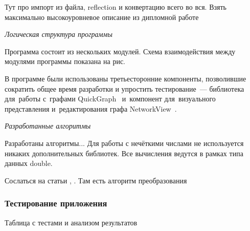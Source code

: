 Тут про импорт из файла, reflection и конвертацию всего во вся. Взять максимально высокоуровневое описание из дипломной работе

\textit{Логическая структура программы}

Программа состоит из нескольких модулей. Схема взаимодействия между модулями программы показана на рис.

В программе были использованы третьесторонние компоненты, позволившие сократить общее время разработки и упростить тестирование~--- библиотека для~работы с~графами QuickGraph~\cite{QuickGraph_Codeplex, QuickGraph_CodeProject} и~компонент для~визуального представления и~редактирования графа NetworkView~\cite{NetworkView_CodeProject}.

\textit{Разработанные алгоритмы}

Разработаны алгоритмы...
Для работы с нечёткими числами не используется никаких дополнительных библиотек. Все вычисления ведутся в рамках типа данных double.

Сослаться на статьи \cite{PMTYMM}, \cite{VSU-5y}. Там есть алгоритм преобразования

\subsubsection*{Тестирование приложения}


Таблица с тестами и анализом результатов